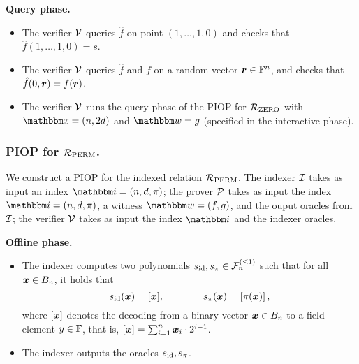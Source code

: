 \textbf{Query phase.}
\begin{itemize}
    \item The verifier $\mathcal{V}$ queries $\hat{f}$ on point $(1, \dots, 1, 0)$ and checks that
        $\hat{f}(1,\dots, 1, 0) = s$.
    \item The verifier $\mathcal{V}$ queries $\hat{f}$ and $f$ on a random vector $\boldsymbol{r} \in \mathbb{F}^n$,
        and checks that $\hat{f}(0, \boldsymbol{r}) = f(\boldsymbol{r})$.
    \item The verifier $\mathcal{V}$ runs the query phase of the PIOP 
    for ${\mathcal{R}}_{\text{ZERO}}$ with $\instR = (n, 2d)$ and $\witR = g$ (specified in the interactive phase).
\end{itemize}

\subsubsection*{PIOP for ${\mathcal{R}}_{\text{PERM}}$.}
We construct a PIOP for the indexed relation ${\mathcal{R}}_{\text{PERM}}$.
The indexer $\mathcal{I}$ takes as input an index $\idxR = (n, d, \perm)$;
the prover $\mathcal{P}$ takes as input the index $\idxR = (n, d, \perm)$,
a witness $\witR = (f, g)$, and the ouput oracles from $\mathcal{I}$;
the verifier $\mathcal{V}$ takes as input the index $\idxR$ and 
the indexer oracles.

\textbf{Offline phase.}
\begin{itemize}
    \item The indexer computes two polynomials $s_{\text{id}}, s_{\pi} \in {\mathcal{F}}_{n}^{(\le{1})}$ such that
    for all $\boldsymbol{x} \in B_{n}$, it holds that 
    \[
        s_{\text{id}}(\boldsymbol{x}) = [\boldsymbol{x}], \qquad\qquad s_{\pi}(\boldsymbol{x}) = [\pi(\boldsymbol{x})]\,,
    \]
    where $[\boldsymbol{x}]$ denotes the decoding from a binary vector $\boldsymbol{x} \in B_{n}$
    to a field element $y \in \mathbb{F}$, that is, $[\boldsymbol{x}] = \sum_{i=1}^{n} \boldsymbol{x}_i \cdot 2^{i-1}$.
    \item The indexer outputs the oracles $s_{\text{id}}, s_{\pi}$.
\end{itemize}

